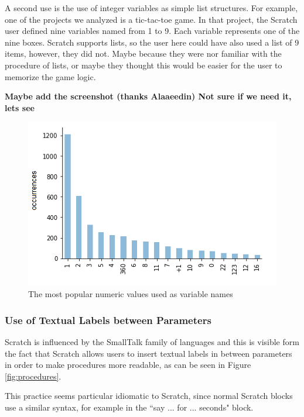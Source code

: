 \documentclass[conference]{IEEEtran}
\newcommand{\todo}[1]{ \textbf{#1} }
\begin{document}
A second use is the use of integer variables as simple list structures. For example, one of the projects we analyzed is a tic-tac-toe game. In that project, the Scratch user defined nine variables named from 1 to 9. Each variable represents one of the nine boxes. Scratch supports lists, so the user here could have also used a list of 9 items, however, they did not. Maybe because they were nor familiar with the procedure of lists, or maybe they thought this would be easier for the user to memorize the game logic.  

\todo{Maybe add the screenshot (thanks Alaaeedin) Not sure if we need it, lets see}

\begin{figure}
	\begin{center}
		\includegraphics[width=\columnwidth]{fig/numeric_as_vars_occurrences}
		\caption{The most popular numeric values used as variable names}
		\label{fig:numeric}
	\end{center}
\end{figure} 

\subsubsection{Use of Textual Labels between Parameters}
Scratch is influenced by the SmallTalk family of languages and this is visible form the fact that Scratch allows users to insert textual labels in between parameters in order to make procedures more readable, as can be seen in Figure \ref{fig:procedures}.

This practice seems particular idiomatic to Scratch, since normal Scratch blocks use a similar syntax, for example in the ``say ... for ... seconds" block. 
\end{document}
